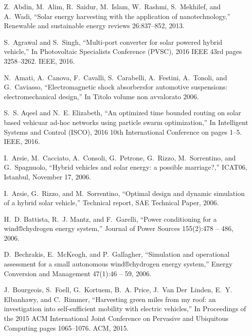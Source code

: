 Z.~Abdin, M.~Alim, R.~Saidur, M.~Islam, W.~Rashmi, S.~Mekhilef, and A.~Wadi,
\newblock ``Solar energy harvesting with the application of nanotechnology,''
\newblock Renewable and sustainable energy reviews 26:837--852, 2013.

S.~Agrawal and S.~Singh,
\newblock ``Multi-port converter for solar powered hybrid vehicle,''
\newblock In Photovoltaic Specialists Conference (PVSC), 2016 IEEE 43rd
  pages 3258--3262. IEEE, 2016.

N.~Amati, A.~Canova, F.~Cavalli, S.~Carabelli, A.~Festini, A.~Tonoli, and
  G.~Caviasso,
\newblock ``Electromagnetic shock absorbersfor automotive suspensions:
  electromechanical design,''
\newblock In Titolo volume non avvalorato 2006.

S.~S. Aqeel and N.~E. Elizabeth,
\newblock ``An optimized time bounded routing on solar based vehicuar ad-hoc
  networks using particle swarm optimization,''
\newblock In Intelligent Systems and Control (ISCO), 2016 10th
  International Conference on pages 1--5. IEEE, 2016.

I.~Arsie, M.~Cacciato, A.~Consoli, G.~Petrone, G.~Rizzo, M.~Sorrentino, and
  G.~Spagnuolo,
\newblock ``Hybrid vehicles and solar energy: a possible marriage?,''
\newblock ICAT06, Istanbul, November 17, 2006.

I.~Arsie, G.~Rizzo, and M.~Sorrentino,
\newblock ``Optimal design and dynamic simulation of a hybrid solar vehicle,''
\newblock Technical report, SAE Technical Paper, 2006.

H.~D. Battista, R.~J. Mantz, and F.~Garelli,
\newblock ``Power conditioning for a wind®chydrogen energy system,''
\newblock Journal of Power Sources 155(2):478 -- 486, 2006.

D.~Bechrakis, E.~McKeogh, and P.~Gallagher,
\newblock ``Simulation and operational assessment for a small autonomous
  wind®chydrogen energy system,''
\newblock Energy Conversion and Management 47(1):46 -- 59, 2006.

J.~Bourgeois, S.~Foell, G.~Kortuem, B.~A. Price, J.~Van Der~Linden, E.~Y.
  Elbanhawy, and C.~Rimmer,
\newblock ``Harvesting green miles from my roof: an investigation into
  self-sufficient mobility with electric vehicles,''
\newblock In Proceedings of the 2015 ACM International Joint Conference on
  Pervasive and Ubiquitous Computing pages 1065--1076. ACM, 2015.

